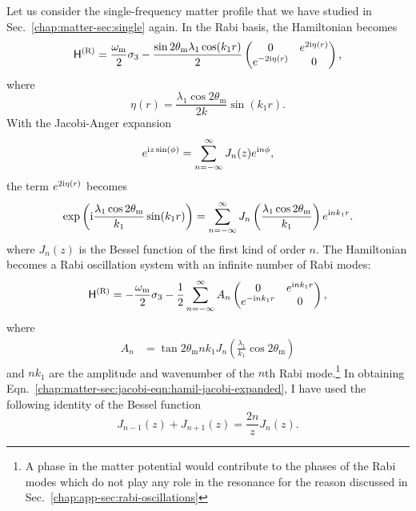 Let us consider the single-frequency matter profile that we have studied in Sec.~\ref{chap:matter-sec:single} again. In the Rabi basis, the Hamiltonian becomes
\begin{equation}
    \mathsf H^{(\mathrm R)} = \frac{\omega_\mathrm m}{2} \sigma_3 - \frac{\sin 2\theta_\mathrm m \lambda_1\cos (k_1 r)}{2} \begin{pmatrix}
        0 & e^{2\mathrm{i} \eta(r)} \\
        e^{-2\mathrm{i} \eta(r)} & 0
    \end{pmatrix},
\end{equation}
where
\begin{equation}
    \eta(r) =  \frac{\lambda_1 \cos 2\theta_{\mathrm m}}{2 k} \sin (k_1 r) .
\end{equation}
With the Jacobi-Anger expansion
\begin{equation}
e^{\mathrm{i} z \sin (\phi)} = \sum_{n=-\infty}^\infty  J_n(z) e^{\mathrm{i} n\phi},
\end{equation}
the term $e^{2\mathrm{i} \eta(r)}$ becomes
\begin{equation}
    \exp\left({\mathrm{i} \frac{\lambda_1 \cos 2\theta_{\mathrm m}}{k_1} \sin (k_1 r) }\right)  =  \sum_{n=-\infty}^{\infty} J_n \left( \frac{\lambda_1 \cos 2\theta_\mathrm m}{k_1}\right) e^{\mathrm{i} n k_1 r}.
\end{equation}
where $J_n(z)$ is the Bessel function of the first kind of order $n$. The Hamiltonian becomes a Rabi oscillation system with an infinite number of Rabi modes:
\begin{equation}
    \mathsf H^{(\mathrm{R})} =
    -\frac{\omega_{\mathrm{m}}}{2} \sigma_3
    -  \frac{1}{2} \sum_{n=-\infty}^\infty A_n \begin{pmatrix}
    0 &  e^{\ri n k_1  r} \\
     e^{ - \ri n k_1 r} & 0
    \end{pmatrix},
    \label{chap:matter-sec:jacobi-eqn:hamil-jacobi-expanded}
\end{equation}
where
\begin{align}
    A_n &= \tan 2\theta_{\mathrm m} n k_1 J_{n} \left( \frac{\lambda_1}{k_1}\cos 2\theta_{\mathrm m} \right)
\end{align}
and $n k_1$ are the amplitude and wavenumber of the $n$th Rabi mode.\footnote{A phase in the matter potential would contribute to the phases of the Rabi modes which do not play any role in the resonance for the reason discussed in Sec.~\ref{chap:app-sec:rabi-oscillations}}
In obtaining Eqn.~\eqref{chap:matter-sec:jacobi-eqn:hamil-jacobi-expanded}, I have used the following identity of the Bessel function
\begin{equation}
    J_{n-1}(z) + J_{n+1}(z) = \frac{2 n}{z} J_n(z).
    \label{eqn:bessel-function-sum-property}
\end{equation}



